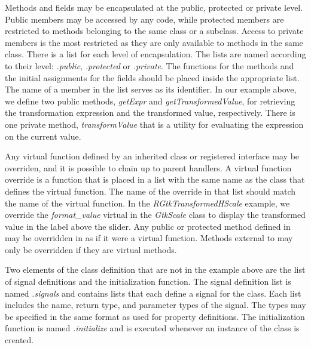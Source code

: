 \documentclass[article]{jss}
\begin{document}
Methods and fields may be encapsulated at the public, protected or private level.
Public members may be accessed by any code,
while protected members are restricted to methods belonging to the same class or
a subclass. Access to private members is the most restricted as they are only 
available to methods in the same class. There is a 
list for each level of encapsulation. The lists are named
according to their level: \emph{.public}, \emph{.protected} or \emph{.private}. 
The functions for the methods and the initial assignments for the fields should
be placed inside the appropriate list. The name of a member in the list 
serves as its identifier. In our example above, we define two public methods,
\emph{getExpr} and \emph{getTransformedValue}, for retrieving the 
transformation expression and the transformed value, respectively. There is
one private method, \emph{transformValue} that is a utility for evaluating
the expression on the current value.

Any virtual function defined by an inherited class or registered interface may be 
overriden, and it is possible to chain up to parent handlers. 
A virtual function override is a function that is 
placed in a list with the same name as the class that defines the virtual 
function. The name of the override in that list should match the name of the virtual 
function. In the \emph{RGtkTransformedHScale} example, we override the 
\emph{format\_value} virtual in the \emph{GtkScale} class to display the
transformed value in the label above the slider. Any public or 
protected method defined in  may be overridden in 
 as if it were a virtual function. Methods external to 
may only be overridden if they are virtual methods.

Two elements of the class definition that are not in the example above are
the list of signal definitions and the initialization function.
The signal definition list is named \emph{.signals} and contains lists that each
define a signal for the class. Each list includes the name, return type, and
parameter types of the signal. The types may be specified in the
same format as used for property definitions. The initialization function is named
\emph{.initialize} and is executed whenever an instance of the class is created.
\end{document}
